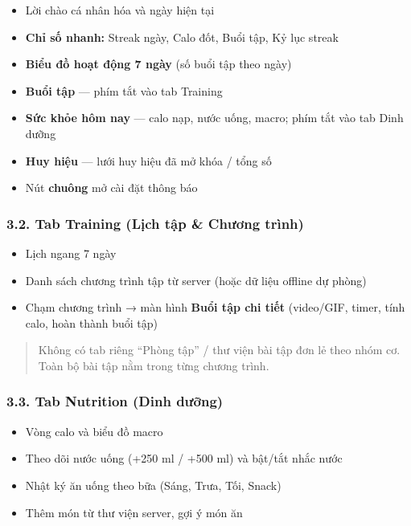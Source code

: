 \documentclass[12pt,a4paper]{article}
\providecommand{\tightlist}{%
  \setlength{\itemsep}{0pt}\setlength{\parskip}{0pt}}
\begin{document}
\begin{itemize}
\tightlist
\item
  Lời chào cá nhân hóa và ngày hiện tại
\item
  \textbf{Chỉ số nhanh:} Streak ngày, Calo đốt, Buổi tập, Kỷ lục streak
\item
  \textbf{Biểu đồ hoạt động 7 ngày} (số buổi tập theo ngày)
\item
  \textbf{Buổi tập} --- phím tắt vào tab Training
\item
  \textbf{Sức khỏe hôm nay} --- calo nạp, nước uống, macro; phím tắt vào
  tab Dinh dưỡng
\item
  \textbf{Huy hiệu} --- lưới huy hiệu đã mở khóa / tổng số
\item
  Nút \textbf{chuông} mở cài đặt thông báo
\end{itemize}

\subsubsection{3.2. Tab Training (Lịch tập \& Chương
trình)}\label{tab-training-lux1ecbch-tux1eadp-chux1b0ux1a1ng-truxecnh}

\begin{itemize}
\tightlist
\item
  Lịch ngang 7 ngày
\item
  Danh sách chương trình tập từ server (hoặc dữ liệu offline dự phòng)
\item
  Chạm chương trình → màn hình \textbf{Buổi tập chi tiết} (video/GIF,
  timer, tính calo, hoàn thành buổi tập)
\end{itemize}

\begin{quote}
Không có tab riêng ``Phòng tập'' / thư viện bài tập đơn lẻ theo nhóm cơ.
Toàn bộ bài tập nằm trong từng chương trình.
\end{quote}

\subsubsection{3.3. Tab Nutrition (Dinh
dưỡng)}\label{tab-nutrition-dinh-dux1b0ux1ee1ng}

\begin{itemize}
\tightlist
\item
  Vòng calo và biểu đồ macro
\item
  Theo dõi nước uống (+250 ml / +500 ml) và bật/tắt nhắc nước
\item
  Nhật ký ăn uống theo bữa (Sáng, Trưa, Tối, Snack)
\item
  Thêm món từ thư viện server, gợi ý món ăn
\end{itemize}
\end{document}
